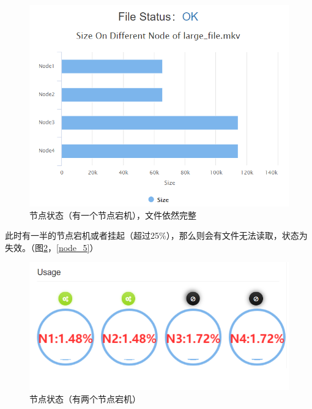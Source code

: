 \documentclass[12pt,a4paper]{article}
\begin{document}
\begin{figure}[htb]
\centering
\includegraphics[width=14cm]{node_3}
\caption{节点状态（有一个节点宕机），文件依然完整 \label{node_3}}
\end{figure}

此时有一半的节点宕机或者挂起（超过25\%），那么则会有文件无法读取，状态为失效。（图\ref{node_4}，\ref{node_5}）

\begin{figure}[htb]
\centering
\includegraphics[width=14cm]{node_4}
\caption{节点状态（有两个节点宕机） \label{node_4}}
\end{figure}
\end{document}
